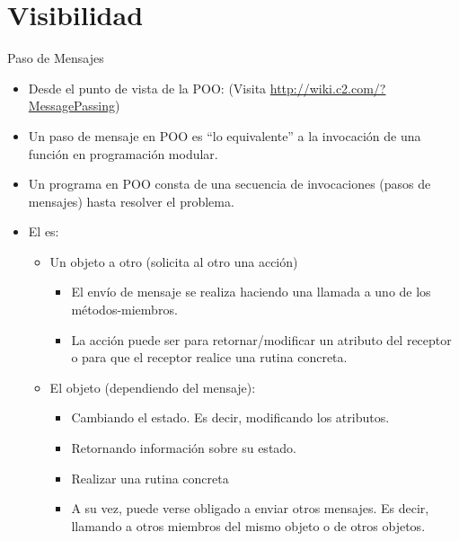 \documentclass[10pt,envcountsect,spanish]{beamer}
\begin{document}
\section{Visibilidad}



\begin{frame}{Paso de Mensajes} 

\begin{itemize}
\item Desde el punto de vista de la POO: ({\footnotesize Visita \url{http://wiki.c2.com/?MessagePassing}})

\centerline{}

\item Un paso de mensaje en POO es ``lo equivalente'' a la invocación de una función en programación modular.

\item Un programa en POO consta de una secuencia de invocaciones (pasos de mensajes) hasta resolver el problema.


\item El  es:
    \begin{itemize}
	\item Un objeto  a otro  (solicita al otro una acción)
	\begin{itemize}
	\item El envío de mensaje se realiza haciendo una llamada a uno de los métodos-miembros.
	\item La acción puede ser para retornar/modificar un atributo del receptor o para que el receptor realice una rutina concreta.
	\end{itemize}
	
	\item El objeto  (dependiendo del mensaje):
    	\begin{itemize}
    	\item Cambiando el estado. Es decir, modificando los atributos.
		\item Retornando información sobre su estado.
		\item Realizar una rutina concreta
    	\item A su vez, puede verse obligado a enviar otros mensajes. Es decir, llamando a otros miembros del mismo objeto o de otros objetos.
    	\end{itemize}
    \end{itemize}	
    
\end{itemize}

\end{frame}
\end{document}
